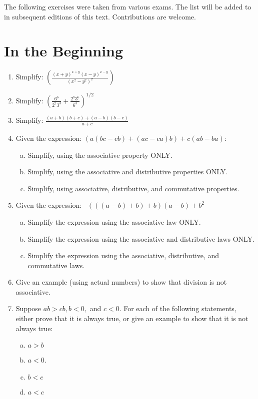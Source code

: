 
The following exercises were taken from various exams. The list will be added to in subsequent editions of this text.  Contributions are welcome.


\section{In the Beginning}
\begin{enumerate}[(1)]
\item
Simplify:
$\displaystyle{ \left(\frac{(x+y)^{x+y}(x-y)^{x-y}}{(x^2 - y^2)^x}\right)}$
\item
Simplify:
$ \displaystyle{\left( \frac{6^6}{2^2 3^3} +  \frac{2^8 3^6}{6^3}\right)^{1/2}} $
\item
Simplify:   $ \displaystyle{\frac{(a+b)(b+c) + (a-b)(b-c)}{a+c} }$
\item
Given the expression:  $( a(bc - cb) + (ac - ca)b) + c(ab - ba)$:
\begin{enumerate}[(a)]
\item
Simplify, using the associative property ONLY.
\item
Simplify, using the associative and distributive properties ONLY.
\item
Simplify, using associative, distributive, and commutative properties.
\end{enumerate}

\item
Given the expression:~
 $(((a-b)+b)+b)(a-b) + b^2$
\begin{enumerate}[(a)]
\item
Simplify the expression using the associative law ONLY.
\item
Simplify the expression using the associative and distributive laws ONLY.
\item
Simplify the expression using the associative, distributive, and commutative laws.
\end{enumerate}

\item
Give an example (using actual numbers) to show that division is not associative.
\item
Suppose $ab>cb, b < 0,$ and $c<0$.  For each of the following statements, either prove that it is always true, or give an example to show that
it is not always true:
\begin{enumerate}[(a)]
\item
$a > b$ \qquad 
\item
$a < 0$.
\item
$b < c$ \qquad 
\item
$a < c$ \qquad 
\end{enumerate}

\end{enumerate}

